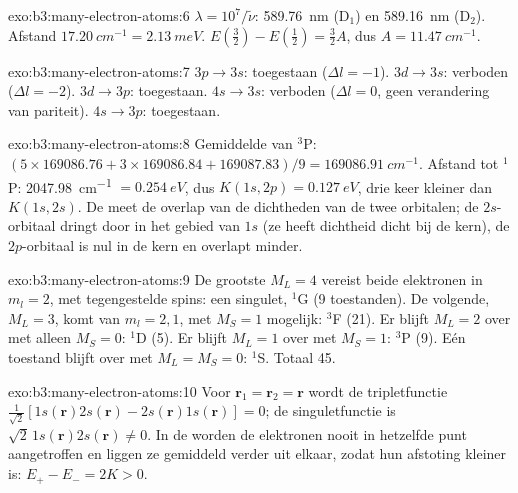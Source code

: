 \begin{solution}{exo:b3:many-electron-atoms:6}
$\lambda = 10^7/\tilde\nu$: \qty{589.76}{nm} (D$_1$) en \qty{589.16}{nm}
(D$_2$). Afstand $\qty{17.20}{cm^{-1}} = \qty{2.13}{meV}$. $E(\frac32) -
E(\frac12) = \frac32A$, dus $A = \qty{11.47}{cm^{-1}}$.
\end{solution}

\begin{solution}{exo:b3:many-electron-atoms:7}
$3p \to 3s$: toegestaan ($\Delta l = -1$). $3d \to 3s$: verboden ($\Delta l = -2$).
$3d \to 3p$: toegestaan. $4s \to 3s$: verboden ($\Delta l = 0$, geen
verandering van pariteit). $4s \to 3p$: toegestaan.
\end{solution}

\begin{solution}{exo:b3:many-electron-atoms:8}
Gemiddelde van ${}^3$P: $(5 \times 169086.76 + 3 \times 169086.84 + 169087.83)/9 =
\qty{169086.91}{cm^{-1}}$. Afstand tot ${}^1$P: \qty{2047.98}{cm^{-1}} $=
\qty{0.254}{eV}$, dus $K(1s,2p) = \qty{0.127}{eV}$, drie keer kleiner dan
$K(1s,2s)$. De  meet de overlap van de dichtheden van
de twee orbitalen; de $2s$-orbitaal dringt door in het gebied van $1s$ (ze
heeft dichtheid dicht bij de kern), de $2p$-orbitaal is nul in de kern en
overlapt minder.
\end{solution}

\begin{solution}{exo:b3:many-electron-atoms:9}
De grootste $M_L = 4$ vereist beide elektronen in $m_l = 2$, met
tegengestelde spins: een singulet, ${}^1$G (9 toestanden). De volgende,
$M_L = 3$, komt van $m_l = 2, 1$, met
$M_S = 1$ mogelijk: ${}^3$F (21). Er blijft $M_L = 2$ over met alleen $M_S = 0$:
${}^1$D (5). Er blijft $M_L = 1$ over met $M_S = 1$: ${}^3$P (9). Eén toestand blijft over met
$M_L = M_S = 0$: ${}^1$S. Totaal 45.
\end{solution}

\begin{solution}{exo:b3:many-electron-atoms:10}
Voor $\mathbf r_1 = \mathbf r_2 = \mathbf r$ wordt de tripletfunctie
$\frac{1}{\sqrt2}[1s(\mathbf r)2s(\mathbf r) - 2s(\mathbf r)1s(\mathbf r)] = 0$; de
singuletfunctie is $\sqrt2\,1s(\mathbf r)2s(\mathbf r) \ne 0$. In de 
worden de elektronen nooit in hetzelfde punt aangetroffen en liggen ze
gemiddeld verder uit elkaar, zodat hun afstoting kleiner is: $E_+ - E_- = 2K > 0$.
\end{solution}

